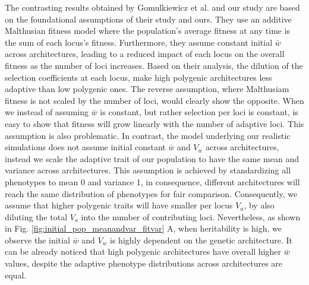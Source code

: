 \documentclass{article}
\begin{document}
The contrasting results obtained by Gomulkiewicz et al. and our study are based on the foundational assumptions of their study and ours. They use an additive Malthusian fitness model where the population's average fitness at any time is the sum of each locus's fitness. Furthermore, they assume constant initial $\bar{w}$ across architectures, leading to a reduced impact of each locus on the overall fitness as the number of loci increases. Based on their analysis, the dilution of the selection coefficients at each locus, make high polygenic architectures less adaptive than low polygenic ones. The reverse assumption, where Malthusiam fitness is not scaled by the number of loci, would clearly show the opposite. When we instead of assuming $\bar{w}$ is constant, but rather selection per loci is constant, is easy to show that fitness will grow linearly with the number of adaptive loci. This assumption is also problematic. In contrast, the model underlying our realistic simulations does not assume initial constant $\bar{w}$ and $V_w$ across architectures, instead we scale the adaptive trait of our population to have the same mean and variance across architectures. This assumption is achieved by standardizing all phenotypes to mean 0 and variance 1, in consequence, different architectures will reach the same distribution of phenotypes for fair comparison. Consequently, we assume that higher polygenic traits will have smaller per locus $V_a$, by also diluting the total $V_a$ into the number of contributing loci. Nevertheless, as shown in Fig. \ref{fig:initial_pop_meanandvar_fitvar} A, when heritability is high, we observe the initial $\bar{w}$ and $V_w$ is highly dependent on the genetic architecture. It can be already noticed that high polygenic architectures have overall higher $\bar{w}$ values, despite the adaptive phenotype distributions across architectures are equal. 
\end{document}
